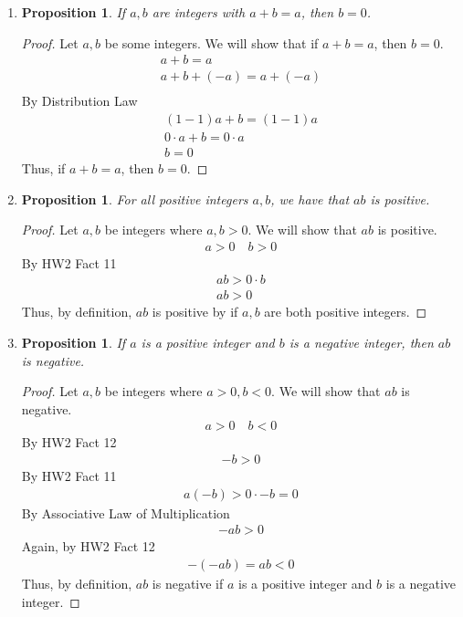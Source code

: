 \documentclass{article}
\newtheorem{prop}[thm]{Proposition}
\begin{document}
\begin{enumerate}
\item \begin{prop}
If $a, b$ are integers with $a + b = a$, then $b = 0$.
\end{prop}
\begin{proof}
Let $a,b$ be some integers. We will show that if $a + b = a$, then $b = 0$.
\begin{gather}
a + b = a \\ 
a + b + (-a) = a + (-a) \\
\end{gather}
By Distribution Law
\begin{gather}
(1-1)a + b = (1-1)a \\
0\cdot a + b = 0\cdot a \\
b = 0
\end{gather}
Thus, if $a + b = a$, then $b = 0$.
\end{proof}

\item
\begin{prop}
For all positive integers $a, b$, we have that $ab$ is positive.
\end{prop}
\begin{proof}
Let $a, b$ be integers where $a, b> 0$. We will show that $ab$ is positive.
\begin{gather}
a > 0\quad b > 0
\end{gather}
By HW2 Fact 11
\begin{gather}
ab > 0\cdot b \\
ab > 0
\end{gather}
Thus, by definition, $ab$ is positive by if $a,b$ are both positive integers.
\end{proof}

\item
\begin{prop}
If $a$ is a positive integer and $b$ is a negative integer, then $ab$ is negative.
\end{prop}
\begin{proof}
Let $a, b$ be integers where $a > 0, b < 0$. We will show that $ab$ is negative.\\
\begin{gather}
a > 0\quad b < 0
\end{gather}
By HW2 Fact 12
\begin{gather}
-b > 0
\end{gather}
By HW2 Fact 11
\begin{gather}
a(-b) > 0\cdot -b = 0
\end{gather}
By Associative Law of Multiplication
\begin{gather}
-ab > 0
\end{gather}
Again, by HW2 Fact 12
\begin{gather}
-(-ab) = ab < 0
\end{gather}
Thus, by definition, $ab$ is negative if $a$ is a positive integer and $b$ is a negative integer.
\end{proof}


\end{enumerate}
\end{document}
